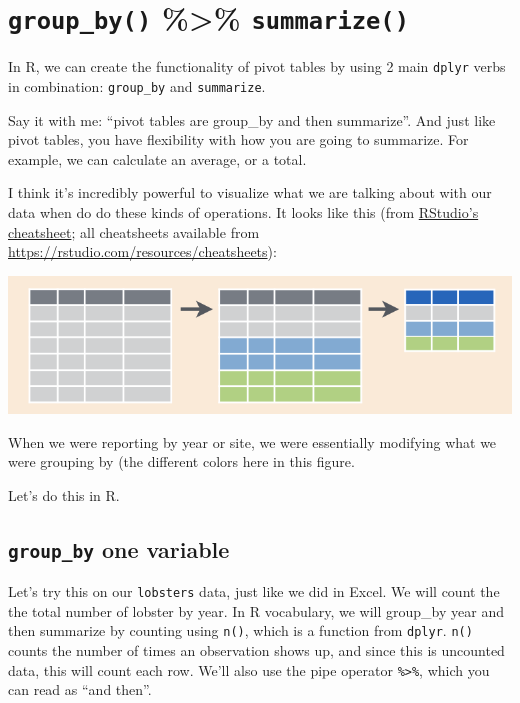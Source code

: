\documentclass[]{book}
\begin{document}
\hypertarget{group_by-summarize}{%
\section{\texorpdfstring{\texttt{group\_by()} \%\textgreater{}\% \texttt{summarize()}}{group\_by() \%\textgreater{}\% summarize()}}\label{group_by-summarize}}

In R, we can create the functionality of pivot tables by using 2 main \texttt{dplyr} verbs in combination: \texttt{group\_by} and \texttt{summarize}.

Say it with me: ``pivot tables are group\_by and then summarize''. And just like pivot tables, you have flexibility with how you are going to summarize. For example, we can calculate an average, or a total.

I think it's incredibly powerful to visualize what we are talking about with our data when do do these kinds of operations. It looks like this (from \href{http://www.rstudio.com/wp-content/uploads/2015/02/data-wrangling-cheatsheet.pdf}{RStudio's cheatsheet}; all cheatsheets available from \url{https://rstudio.com/resources/cheatsheets}):

\includegraphics[width=0.8\linewidth]{img/rstudio-cheatsheet-group_by_summarize}

When we were reporting by year or site, we were essentially modifying what we were grouping by (the different colors here in this figure.

Let's do this in R.

\hypertarget{group_by-one-variable}{%
\subsection{\texorpdfstring{\texttt{group\_by} one variable}{group\_by one variable}}\label{group_by-one-variable}}

Let's try this on our \texttt{lobsters} data, just like we did in Excel. We will count the the total number of lobster by year. In R vocabulary, we will group\_by year and then summarize by counting using \texttt{n()}, which is a function from \texttt{dplyr}. \texttt{n()} counts the number of times an observation shows up, and since this is uncounted data, this will count each row. We'll also use the pipe operator \texttt{\%\textgreater{}\%}, which you can read as ``and then''.
\end{document}

